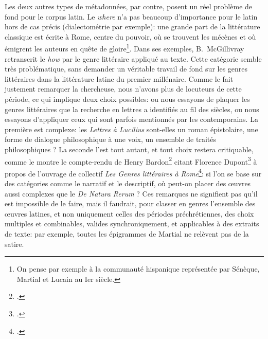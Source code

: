 Les deux autres types de métadonnées, par contre, posent un réel problème de fond pour le corpus latin. Le \textit{where} n'a pas beaucoup d'importance pour le latin hors de cas précis (dialectométrie par exemple): une grande part de la littérature classique est écrite à Rome, centre du pouvoir, où se trouvent les mécènes et où émigrent les auteurs en quête de gloire\footnote{On pense par exemple à la communauté hispanique représentée par Sénèque, Martial et Lucain au Ier siècle.}. Dans ses exemples, B.~McGillivray retranscrit le \textit{how} par le genre littéraire appliqué au texte. Cette catégorie semble très problématique, sans demander un véritable travail de fond sur les genres littéraires dans la littérature latine du premier millénaire. Comme le fait justement remarquer la chercheuse, nous n'avons plus de locuteurs de cette période, ce qui implique deux choix possibles: ou nous essayons de plaquer les genres littéraires que la recherche en lettres a identifiés au fil des siècles, ou nous essayons d'appliquer ceux qui sont parfois mentionnés par les contemporains. La première est complexe: les \textit{Lettres à Lucilius} sont-elles un roman épistolaire, une forme de dialogue philosophique à une voix, un ensemble de traités philosophiques ? La seconde l'est tout autant, et tout choix restera critiquable, comme le montre le compte-rendu de Henry Bardon\footcite{bardon_review_1983} citant Florence Dupont\footcite{dupont_ciceron_1982} à propos de l'ouvrage de collectif \textit{Les Genres littéraires à Rome}\footcite{martin_les_1981}: si l'on se base sur des catégories comme le narratif et le descriptif, où peut-on placer des œuvres aussi complexes que le \textit{De Natura Rerum} ? Ces remarques ne signifient pas qu'il est impossible de le faire, mais il faudrait, pour classer en genres l'ensemble des œuvres latines, et non uniquement celles des périodes préchrétiennes, des choix multiples et combinables, valides synchroniquement, et applicables à des extraits de texte: par exemple, toutes les épigrammes de Martial ne relèvent pas de la satire.  

